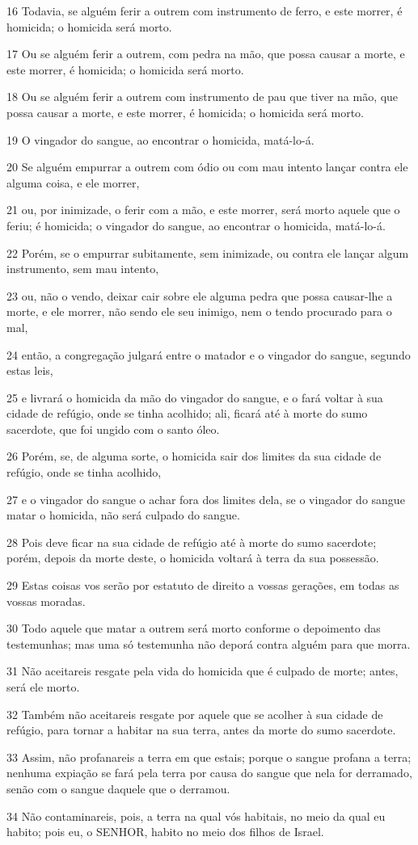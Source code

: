 \par 16 Todavia, se alguém ferir a outrem com instrumento de ferro, e este morrer, é homicida; o homicida será morto.
\par 17 Ou se alguém ferir a outrem, com pedra na mão, que possa causar a morte, e este morrer, é homicida; o homicida será morto.
\par 18 Ou se alguém ferir a outrem com instrumento de pau que tiver na mão, que possa causar a morte, e este morrer, é homicida; o homicida será morto.
\par 19 O vingador do sangue, ao encontrar o homicida, matá-lo-á.
\par 20 Se alguém empurrar a outrem com ódio ou com mau intento lançar contra ele alguma coisa, e ele morrer,
\par 21 ou, por inimizade, o ferir com a mão, e este morrer, será morto aquele que o feriu; é homicida; o vingador do sangue, ao encontrar o homicida, matá-lo-á.
\par 22 Porém, se o empurrar subitamente, sem inimizade, ou contra ele lançar algum instrumento, sem mau intento,
\par 23 ou, não o vendo, deixar cair sobre ele alguma pedra que possa causar-lhe a morte, e ele morrer, não sendo ele seu inimigo, nem o tendo procurado para o mal,
\par 24 então, a congregação julgará entre o matador e o vingador do sangue, segundo estas leis,
\par 25 e livrará o homicida da mão do vingador do sangue, e o fará voltar à sua cidade de refúgio, onde se tinha acolhido; ali, ficará até à morte do sumo sacerdote, que foi ungido com o santo óleo.
\par 26 Porém, se, de alguma sorte, o homicida sair dos limites da sua cidade de refúgio, onde se tinha acolhido,
\par 27 e o vingador do sangue o achar fora dos limites dela, se o vingador do sangue matar o homicida, não será culpado do sangue.
\par 28 Pois deve ficar na sua cidade de refúgio até à morte do sumo sacerdote; porém, depois da morte deste, o homicida voltará à terra da sua possessão.
\par 29 Estas coisas vos serão por estatuto de direito a vossas gerações, em todas as vossas moradas.
\par 30 Todo aquele que matar a outrem será morto conforme o depoimento das testemunhas; mas uma só testemunha não deporá contra alguém para que morra.
\par 31 Não aceitareis resgate pela vida do homicida que é culpado de morte; antes, será ele morto.
\par 32 Também não aceitareis resgate por aquele que se acolher à sua cidade de refúgio, para tornar a habitar na sua terra, antes da morte do sumo sacerdote.
\par 33 Assim, não profanareis a terra em que estais; porque o sangue profana a terra; nenhuma expiação se fará pela terra por causa do sangue que nela for derramado, senão com o sangue daquele que o derramou.
\par 34 Não contaminareis, pois, a terra na qual vós habitais, no meio da qual eu habito; pois eu, o SENHOR, habito no meio dos filhos de Israel.

